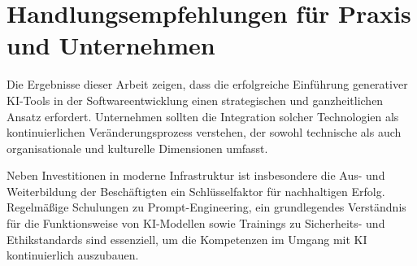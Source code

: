 

\section{Handlungsempfehlungen für Praxis und Unternehmen}

Die Ergebnisse dieser Arbeit zeigen, dass die erfolgreiche Einführung
generativer KI-Tools in der Softwareentwicklung einen strategischen und
ganzheitlichen Ansatz erfordert. Unternehmen sollten die Integration solcher
Technologien als kontinuierlichen Veränderungsprozess verstehen, der sowohl
technische als auch organisationale und kulturelle Dimensionen umfasst.

Neben Investitionen in moderne Infrastruktur ist insbesondere die Aus- und
Weiterbildung der Beschäftigten ein Schlüsselfaktor für nachhaltigen Erfolg.
Regelmäßige Schulungen zu Prompt-Engineering, ein grundlegendes Verständnis für
die Funktionsweise von KI-Modellen sowie Trainings zu Sicherheits- und
Ethikstandards sind essenziell, um die Kompetenzen im Umgang mit KI
kontinuierlich auszubauen.

